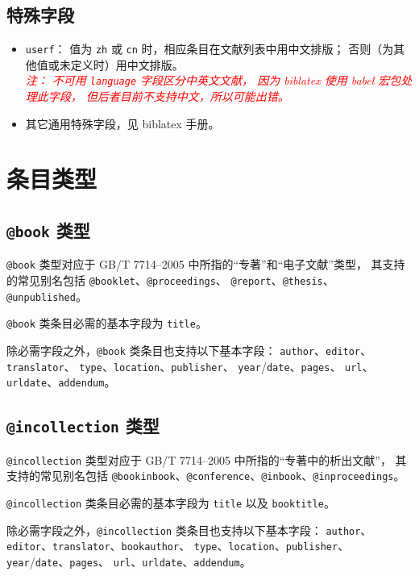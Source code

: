 \documentclass[UTF8, fancyhdr, hyperref]{ctexart}
\newcommand{\myemph}[1]{\emph{\textcolor{red}{#1}}}
\begin{document}
\subsection{特殊字段}

\begin{itemize}
	\item \verb|userf|：
		值为 \verb|zh| 或 \verb|cn| 时，相应条目在文献列表中用中文排版；
		否则（为其他值或未定义时）用中文排版。\\
		\myemph{%
			注：
			不可用 \texttt{language} 字段区分中英文文献，
			因为 biblatex 使用 babel\supercite{babel} 宏包处理此字段，
			但后者目前不支持中文，所以可能出错。%
		}
	\item 其它通用特殊字段，见 biblatex 手册\supercite{biblatex}。
\end{itemize}

\section{条目类型}\label{sec:entries}
\subsection{\texttt{@book} 类型}

\verb|@book| 类型对应于 GB/T 7714--2005 中所指的“专著”和“电子文献”类型，
其支持的常见别名包括 \verb|@booklet|、\verb|@proceedings|、
\verb|@report|、\verb|@thesis|、\verb|@unpublished|。

\verb|@book| 类条目必需的基本字段为 \verb|title|。

除必需字段之外，\verb|@book| 类条目也支持以下基本字段：
\verb|author|、\verb|editor|、\verb|translator|、
\verb|type|、\verb|location|、\verb|publisher|、
\verb|year|/\verb|date|、\verb|pages|、
\verb|url|、\verb|urldate|、\verb|addendum|。

\subsection{\texttt{@incollection} 类型}

\verb|@incollection| 类型对应于 GB/T 7714--2005 中所指的“专著中的析出文献”，
其支持的常见别名包括
\verb|@bookinbook|、\verb|@conference|、\verb|@inbook|、\verb|@inproceedings|。

\verb|@incollection| 类条目必需的基本字段为 \verb|title| 以及 \verb|booktitle|。

除必需字段之外，\verb|@incollection| 类条目也支持以下基本字段：
\verb|author|、\verb|editor|、\verb|translator|、\verb|bookauthor|、
\verb|type|、\verb|location|、\verb|publisher|、
\verb|year|/\verb|date|、\verb|pages|、
\verb|url|、\verb|urldate|、\verb|addendum|。
\end{document}
